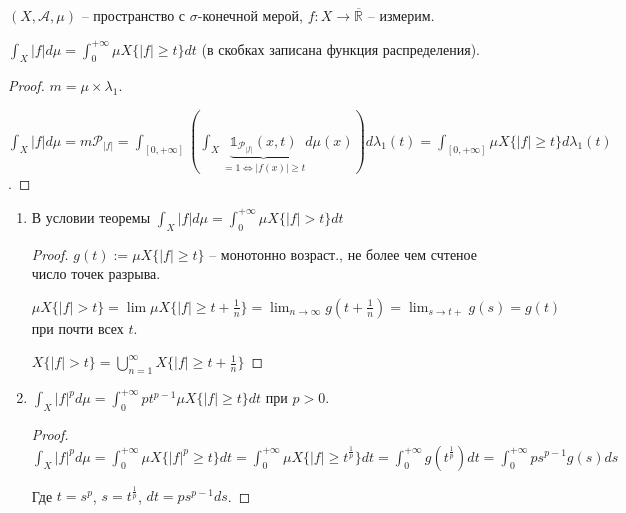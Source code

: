 \begin{theorem}
    $(X, \mathcal{A}, \mu)$ -- пространство с $\sigma$-конечной мерой, $f: X \rightarrow \overline{\mathbb{R}}$ -- измерим.

    $\int_X{|f| d \mu} = \int_{0}^{+\infty} {\mu X \{ |f| \geq t \}}dt$ (в скобках записана функция распределения).
\end{theorem}
\begin{proof}
    $m = \mu \times \lambda_{1}$.

    $\int_X{|f| d \mu} = m \mathcal{P}_{|f|} = \int_{[0, +\infty]} {\left(\int_{X} {\underbrace{\mathds{1}_{\mathcal{P}_{|f|}}(x, t)}_{=1 \Leftrightarrow |f(x)| \geq t} d \mu(x)}\right) d \lambda_1(t)} = \int_{[0, +\infty]}{\mu X \{ |f| \geq t \} d \lambda_1(t)}$.

\end{proof}

\begin{consequence}
    \begin{enumerate}
        \item {
            В условии теоремы $\int_X {|f| d \mu} = \int_{0}^{+\infty} {\mu X\{ |f| > t \}dt}$

            \begin{proof}
                $g(t) := \mu X \{ |f| \geq t \}$ -- монотонно возраст., не более чем счтеное число точек разрыва.

                $\mu X\{ |f| > t \} = \lim{\mu X \{ |f| \geq t+\frac{1}{n} \}} = \lim_{n \rightarrow \infty}{g(t + \frac{1}{n})} = \lim_{s \rightarrow t+}{g(s)} = g(t)$ при почти всех $t$.

                $X \{ |f| > t \} = \bigcup_{n=1}^{\infty} X \{ |f| \geq t + \frac{1}{n} \}$
            \end{proof}
        }
        \item {
            $\int_X {|f|^p d \mu} = \int_{0}^{+\infty} {p t^{p-1} \mu X\{ |f| \geq t \} dt}$ при $p > 0$.

            \begin{proof}
                $\int_X {|f|^p d \mu} = \int_{0}^{+\infty} {\mu X \{ |f|^p \geq t \}dt} = \int_0^{+\infty}{\mu X \{ |f| \geq t^{\frac{1}{p}} \} dt} = \int_{0}^{+\infty}{g (t^{\frac{1}{p}}) dt} = \int_{0}^{+\infty}{p s^{p-1} g(s) ds}$
                
                Где $t = s^p$, $s = t^{\frac{1}{p}}$, $dt = ps^{p-1}ds$.
            \end{proof}
        }
    \end{enumerate}
\end{consequence}